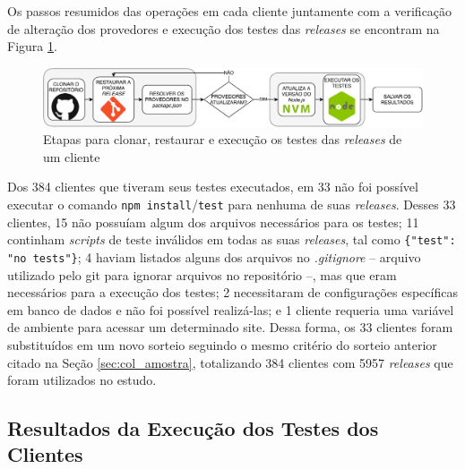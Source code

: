 Os passos resumidos das operações em cada cliente juntamente com a verificação de alteração dos provedores e execução dos testes das \textit{releases} se encontram na Figura \ref{fig:steps_work}.

\begin{figure}
    \centering
    \includegraphics[scale=0.7]{figuras/steps_work.pdf}
    \caption{Etapas para clonar, restaurar e execução os testes das \textit{releases} de um cliente}
    \label{fig:steps_work}
\end{figure}{}

Dos 384 clientes que tiveram seus testes executados, em 33 não foi possível executar o comando \texttt{npm install}/\texttt{test} para nenhuma de suas \textit{releases}. Desses 33 clientes, 15 não possuíam algum dos arquivos necessários para os testes; 11 continham \textit{scripts} de teste inválidos em todas as suas \textit{releases}, tal como \texttt{\{"test": "no tests"\}}; 4 haviam listados alguns dos arquivos no \textit{.gitignore} -- arquivo utilizado pelo \textsf{git} para ignorar arquivos no repositório --, mas que eram necessários para a execução dos testes; 2 necessitaram de configurações específicas em banco de dados e não foi possível realizá-las; e 1 cliente requeria uma variável de ambiente para acessar um determinado site. Dessa forma, os 33 clientes foram substituídos em um novo sorteio seguindo o mesmo critério do sorteio anterior citado na Seção \ref{sec:col_amostra}, totalizando 384 clientes com 5957 \textit{releases} que foram utilizados no estudo.%

\subsection{Resultados da Execução dos Testes dos Clientes}
\label{sec:col_dados}

